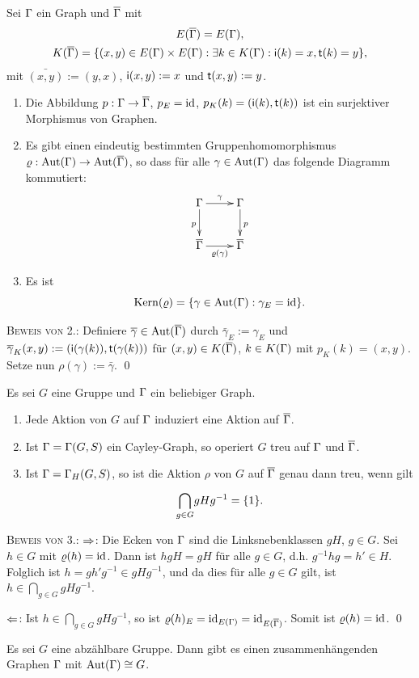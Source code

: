 \documentclass[a4paper, 12pt, twoside]{article}
\begin{document}
\BEM Sei $\Gamma$ ein Graph und $\overline{\Gamma}$ mit
\begin{gather*}
E(\overline{\Gamma}) = E(\Gamma), \\
K(\overline{\Gamma}) =
\{(x,y)\in E(\Gamma)\times E(\Gamma) : \exists k\in
	K(\Gamma):
	\mathsf{i}(k)=x, \mathsf{t}(k)=y \},
\end{gather*}
mit $\bar{(x,y)}:=(y,x)$, $\mathsf{i}(x,y):=x$ und $\mathsf{t}(x,y):=y$.
\begin{enumerate}
\item Die Abbildung $p:\Gamma\rightarrow\overline{\Gamma}$, $p_E=\mathrm{id}$,
$p_K(k)=(\mathsf{i}(k),\mathsf{t}(k))$ ist ein surjektiver Morphismus von
Graphen.
\item Es gibt einen eindeutig bestimmten Gruppenhomomorphismus
$\varrho:\mathrm{Aut}(\Gamma)\rightarrow\mathrm{Aut}(\overline{\Gamma})$, so dass für alle
$\gamma\in\mathrm{Aut}(\Gamma)$ das folgende Diagramm kommutiert:
\[\xymatrix{
\GR \ar[r]^{\gamma} \ar[d]_{p} & \GR \ar[d]^{p} \\
\bar{\GR} \ar[r]_{\rho(\gamma)} & \bar{\GR}
}\]
\item
Es ist
\[
\mathrm{Kern}(\varrho) = \{ \gamma\in\mathrm{Aut}(\Gamma) : \gamma_E=\mathrm{id} \}.
\]
\end{enumerate}
\textsc{Beweis von 2.:} Definiere $\overline{\gamma}\in\mathrm{Aut}(\overline{\Gamma})$
durch $\bar{\gamma}_E := \gamma_E$ und
$\overline{\gamma}_K(x,y) := (\mathsf{i}(\gamma(k)),\mathsf{t}(\gamma(k)))$
für $(x,y)\in K(\overline{\Gamma})$, $k\in K(\Gamma)$ mit $p_K(k)=(x,y)$.
Setze nun $\rho(\gamma):=\bar{\gamma}$.
\qed

\FOLG Es sei $G$ eine Gruppe und $\Gamma$ ein beliebiger Graph.
\begin{enumerate}
\item Jede Aktion von $G$ auf $\Gamma$ induziert eine Aktion auf
$\overline{\Gamma}$.
\item Ist $\Gamma=\Gamma(G,S)$ ein Cayley-Graph, so operiert $G$ treu
auf $\Gamma$ und $\overline{\Gamma}$.
\item Ist $\Gamma=\Gamma_H(G,S)$, so ist die Aktion $\rho$ von $G$ auf
$\overline{\Gamma}$ genau dann treu, wenn gilt
\[
\overset{}{\underset{g\in G}{\mathop{\bigcap}}} gHg^{-1} = \{1\}.
\]
\end{enumerate}
\textsc{Beweis von 3.:} \glqq$\Rightarrow$\grqq:
Die Ecken von $\Gamma$ sind die Linksnebenklassen
$gH$, $g\in G$. Sei $h\in G$ mit $\varrho(h)=\mathrm{id}$. Dann ist
$hgH=gH$ für alle $g\in G$, d.h. $g^{-1}hg=h'\in H$.
Folglich ist $h=gh'g^{-1}\in gHg^{-1}$, und da dies für alle
$g\in G$ gilt, ist $h\in \bigcap_{g\in G} gHg^{-1}$.

\glqq$\Leftarrow$\grqq: Ist $h\in \bigcap_{g\in G} gHg^{-1}$, so ist
$\varrho(h)_E=\mathrm{id}_{E(\Gamma)}=\mathrm{id}_{E(\overline{\Gamma})}$.
Somit ist $\varrho(h)=\mathrm{id}$.
\qed

\SATZ\label{satz_abzb} Es sei $G$ eine abzählbare Gruppe. Dann gibt es einen
zusammenhängenden Graphen $\Gamma$ mit $\mathrm{Aut}(\Gamma)\cong G$.
\end{document}
